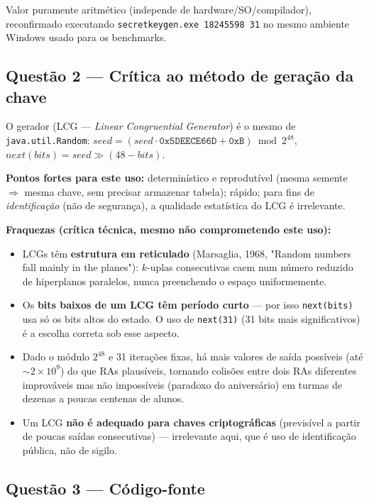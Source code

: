 \documentclass[11pt,a4paper]{article}
\renewcommand{\_}{\underscoreoriginal\allowbreak}
\begin{document}
Valor puramente aritmético (independe de hardware/SO/compilador),
reconfirmado executando \texttt{secretkey\_gen.exe 18245598 31} no
mesmo ambiente Windows usado para os benchmarks.

\subsection{Questão 2 --- Crítica ao método de geração da chave}

O gerador (LCG --- \emph{Linear Congruential Generator}) é o mesmo de
\texttt{java.util.Random}: $\mathit{seed} = (\mathit{seed}\cdot
\texttt{0x5DEECE66D} + \texttt{0xB}) \bmod 2^{48}$,
$\mathit{next}(\mathit{bits}) = \mathit{seed} \gg (48-\mathit{bits})$.

\textbf{Pontos fortes para este uso:} determinístico e reprodutível
(mesma semente $\Rightarrow$ mesma chave, sem precisar armazenar
tabela); rápido; para fins de \emph{identificação} (não de segurança), a
qualidade estatística do LCG é irrelevante.

\textbf{Fraquezas (crítica técnica, mesmo não comprometendo este uso):}

\begin{itemize}
  \item LCGs têm \textbf{estrutura em reticulado} (Marsaglia, 1968,
    "Random numbers fall mainly in the planes"): $k$-uplas consecutivas
    caem num número reduzido de hiperplanos paralelos, nunca
    preenchendo o espaço uniformemente.
  \item Os \textbf{bits baixos de um LCG têm período curto} --- por isso
    \texttt{next(bits)} usa só os bits altos do estado. O uso de
    \texttt{next(31)} (31 bits mais significativos) é a escolha correta
    sob esse aspecto.
  \item Dado o módulo $2^{48}$ e 31 iterações fixas, há mais valores de
    saída possíveis (até $\sim2\times10^9$) do que RAs plausíveis,
    tornando colisões entre dois RAs diferentes improváveis mas não
    impossíveis (paradoxo do aniversário) em turmas de dezenas a poucas
    centenas de alunos.
  \item Um LCG \textbf{não é adequado para chaves criptográficas}
    (previsível a partir de poucas saídas consecutivas) --- irrelevante
    aqui, que é uso de identificação pública, não de sigilo.
\end{itemize}

\subsection{Questão 3 --- Código-fonte}
\end{document}
